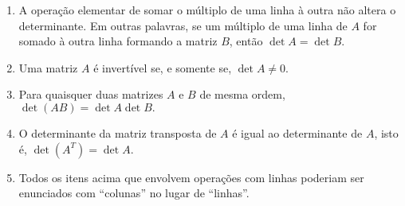 \documentclass[../livro.tex]{subfiles}  %
\begin{document}
\begin{theorem}
\begin{enumerate}[$(i)$]
\item A operação elementar de somar o múltiplo de uma linha à outra não altera o determinante. Em outras palavras, se um múltiplo de uma linha de $A$ for somado à outra linha formando a matriz $B$, então $\det A = \det B$.

\item Uma matriz $A$ é invertível se, e somente se, $\det A \neq 0.$

\item Para quaisquer duas matrizes $A$ e $B$ de mesma ordem, $\det (AB) = \det A \det B.$

\item O determinante da matriz transposta de $A$ é igual ao determinante de $A$, isto é, $\det (A^T) = \det A.$

\item Todos os itens acima que envolvem operações com linhas poderiam ser enunciados com ``colunas'' no lugar de ``linhas''.
\end{enumerate}
\end{theorem}
\end{document}
